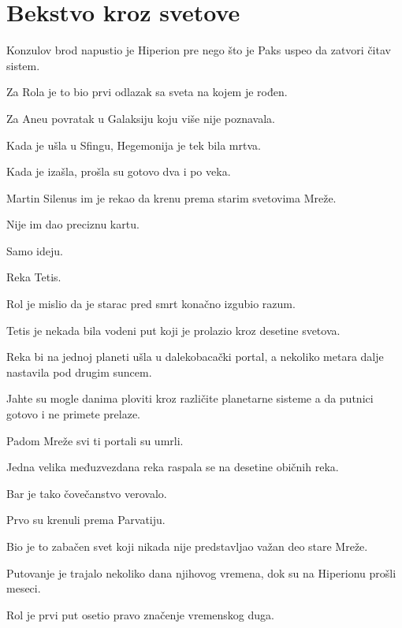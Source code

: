 
\chapter{Bekstvo kroz svetove}


Konzulov brod napustio je Hiperion pre nego što je Paks uspeo da zatvori čitav sistem.

Za Rola je to bio prvi odlazak sa sveta na kojem je rođen.

Za Aneu povratak u Galaksiju koju više nije poznavala.

Kada je ušla u Sfingu, Hegemonija je tek bila mrtva.

Kada je izašla, prošla su gotovo dva i po veka.

\bigskip

Martin Silenus im je rekao da krenu prema starim svetovima Mreže.

Nije im dao preciznu kartu.

Samo ideju.

Reka Tetis.

\bigskip

Rol je mislio da je starac pred smrt konačno izgubio razum.

Tetis je nekada bila vodeni put koji je prolazio kroz desetine svetova.

Reka bi na jednoj planeti ušla u dalekobacački portal, a nekoliko metara dalje nastavila pod drugim suncem.

Jahte su mogle danima ploviti kroz različite planetarne sisteme a da putnici gotovo i ne primete prelaze.

Padom Mreže svi ti portali su umrli.

Jedna velika međuzvezdana reka raspala se na desetine običnih reka.

\bigskip

Bar je tako čovečanstvo verovalo.

\bigskip

Prvo su krenuli prema Parvatiju.

Bio je to zabačen svet koji nikada nije predstavljao važan deo stare Mreže.

Putovanje je trajalo nekoliko dana njihovog vremena, dok su na Hiperionu prošli meseci.

Rol je prvi put osetio pravo značenje vremenskog duga.

